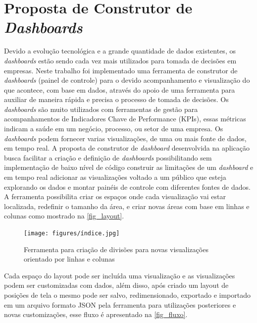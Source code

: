 \documentclass[
	12pt,				%
	openright,			%
	oneside,			%
	a4paper,			%
	english,			%
	brazil				%
	]{abntex2}
\begin{document}
\section{Proposta de Construtor de  \textit{Dashboards}}
Devido a evolução tecnológica e a grande quantidade de dados existentes, os \textit{dashboards} estão sendo cada vez mais utilizados para tomada de decisões em empresas. 
Neste trabalho foi implementado uma ferramenta de construtor de  \textit{dashboards} (painel de controle) para o devido acompanhamento e visualização do que acontece, com base em dados, através do apoio de uma ferramenta para auxiliar de maneira rápida e precisa o processo de tomada de decisões.
Os  \textit{dashboards} são muito utilizados com ferramentas de gestão para acompanhamentos de Indicadores Chave de Performance (KPIs), essas métricas indicam a saúde em um negócio, processo, ou setor de uma empresa. Os  \textit{dashboards} podem fornecer varias visualizações, de uma ou mais fonte de dados, em tempo real.
A proposta de construtor de \textit{dashboard} desenvolvida na aplicação busca facilitar a criação e definição de  \textit{dashboards} possibilitando sem implementação de baixo nível de código construir as limitações de um  \textit{dashboard} e em tempo real adicionar as visualizações voltado a um público que esteja explorando os dados e montar painéis de controle com diferentes fontes de dados.
A ferramenta possibilita criar os espaços onde cada visualização vai estar localizada, redefinir o tamanho da área, e criar novas áreas com base em linhas e colunas como mostrado na \autoref{fig_layout}.

\begin{figure}
	\caption{\label{fig_layout}Ferramenta para criação de divisões para novas visualizações orientado por linhas e colunas}
	\begin{center}
	    \texttt{[image: figures/índice.jpg]}
	\end{center}
\end{figure}

Cada espaço do layout pode ser incluída uma visualização e as visualizações podem ser customizadas com dados, além disso, após criado um layout de posições de tela o mesmo pode ser salvo, redimensionado, exportado e importado em um arquivo formato JSON pela ferramenta para utilizações posteriores e novas customizações, esse fluxo é apresentado na \autoref{fig_fluxo}.
\end{document}
